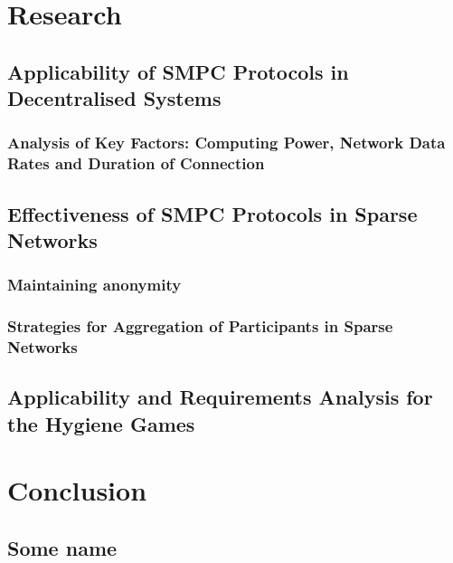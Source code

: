 \chapter{Research}
	\section{Applicability of SMPC Protocols in Decentralised Systems}
	
	\subsection*{Analysis of Key Factors: Computing Power, Network Data Rates and Duration of Connection}
	\section{Effectiveness of SMPC Protocols in Sparse Networks}
	\subsection*{Maintaining anonymity}
	\subsection*{Strategies for Aggregation of Participants in Sparse Networks}
	\section{Applicability and Requirements Analysis for the Hygiene Games}

\chapter{Conclusion}

\clearpage
\renewcommand{\bibname}{References} %
\printbibliography[heading=bibintoc] %

\begin{appendices}
	\chapter{Some name}
	\lipsum[3]
\end{appendices}

